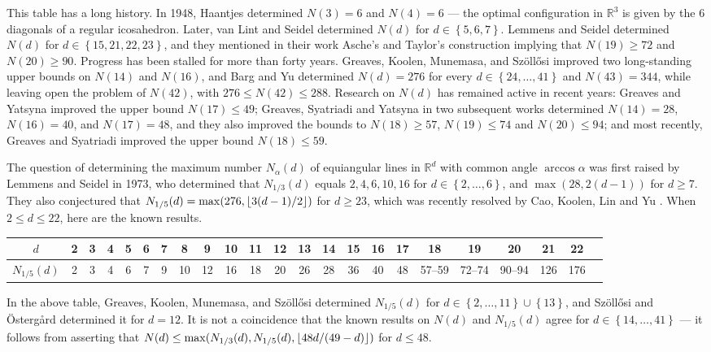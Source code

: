 \documentclass[11pt]{article}
\theoremstyle{definition}
\theoremstyle{remark}
\DeclarePairedDelimiter\floor{\lfloor}{\rfloor}
\newcommand{\sset}[1]{\left\{{#1}\right\}}
\newcommand{\R}{\mathbb{R}}
\begin{document}
This table has a long history. In 1948, Haantjes \cite{H48} determined $N(3) = 6$ and $N(4) = 6$ --- the optimal configuration in $\R^3$ is given by the $6$ diagonals of a regular icosahedron. Later, van Lint and Seidel \cite{vLS66} determined $N(d)$ for $d \in \sset{5,6,7}$. Lemmens and Seidel \cite{LS73} determined $N(d)$ for $d \in \sset{15,21,22,23}$, and they mentioned in their work Asche's and Taylor's construction implying that $N(19) \ge 72$ and $N(20) \ge 90$. Progress has been stalled for more than forty years. Greaves, Koolen, Munemasa, and Sz\"{o}ll\H{o}si \cite{GKMS16} improved two long-standing upper bounds on $N(14)$ and $N(16)$, and Barg and Yu \cite{BY14} determined $N(d) = 276$ for every $d \in \sset{24, \dots, 41}$ and $N(43) = 344$, while leaving open the problem of $N(42)$, with $276 \le N(42) \le 288$. Research on $N(d)$ has remained active in recent years: Greaves and Yatsyna \cite{GY19} improved the upper bound $N(17) \le 49$; Greaves, Syatriadi and Yatsyna in two subsequent works \cite{GSY21,GSY23} determined $N(14) = 28$, $N(16) = 40$, and $N(17) = 48$, and they also improved the bounds to $N(18) \ge 57$, $N(19) \le 74$ and $N(20) \le 94$; and most recently, Greaves and Syatriadi \cite{GS24} improved the upper bound $N(18) \le 59$.

The question of determining the maximum number $N_\alpha(d)$ of equiangular lines in $\R^d$ with common angle $\arccos\alpha$ was first raised by Lemmens and Seidel \cite{LS73} in 1973, who determined that $N_{1/3}(d)$ equals $2,4,6,10,16$ for $d \in \sset{2,\dots,6}$, and $\max(28, 2(d-1))$ for $d \ge 7$. They also conjectured that $N_{1/5}(d) = \max(276, \floor{3(d-1)/2})$ for $d \ge 23$, which was recently resolved by Cao, Koolen, Lin and Yu \cite{CKLY22}. When $2 \le d \le 22$, here are the known results.

\begin{center}
    \setlength{\tabcolsep}{4pt}
    \begin{tabular}{ccccccccccccccccccccccc}
        $d$ & 2 & 3 & 4 & 5 & 6 & 7 & 8 & 9 & 10 & 11 & 12 & 13 & 14 & 15 & 16 & 17 & 18 & 19 & 20 & 21 & 22 \\
        \hline
        $N_{1/5}(d)$ & 2 & 3 & 4 & 6 & 7 & 9 & 10 & 12 & 16 & 18 & 20 & 26 & 28 & 36 & 40 & 48 & 57--59 & 72--74 & 90--94 & 126 & 176
    \end{tabular}
\end{center}

In the above table, Greaves, Koolen, Munemasa, and Sz\"{o}ll\H{o}si \cite{GKMS16} determined $N_{1/5}(d)$ for $d \in \sset{2,\dots, 11} \cup \sset{13}$, and Sz\"{o}ll\H{o}si and \"{O}sterg\aa rd \cite{SO18} determined it for $d = 12$. It is not a coincidence that the known results on $N(d)$ and $N_{1/5}(d)$ agree for $d \in \sset{14, \dots, 41}$ --- it follows from \cite[Theorem 3.7]{LS73} asserting that $N(d) \le \max(N_{1/3}(d), N_{1/5}(d), \floor{48d/(49-d)})$ for $d \le 48$.
\end{document}
